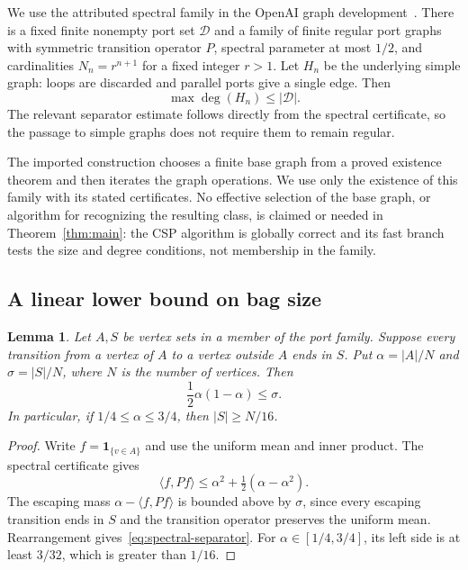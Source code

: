 \documentclass[11pt,reqno]{amsart}
\numberwithin{equation}{section}
\newtheorem{lemma}[theorem]{Lemma}
\theoremstyle{definition}
\theoremstyle{remark}
\newcommand{\ind}[1]{\mathbf 1_{\{#1\}}}
\begin{document}
We use the attributed spectral family in the OpenAI graph development~\cite{OpenAIGraph}. There is a fixed finite nonempty port set $\mathcal D$ and a family of finite regular port graphs with symmetric transition operator $P$, spectral parameter at most $1/2$, and cardinalities $N_n=r^{n+1}$ for a fixed integer $r>1$. Let $H_n$ be the underlying simple graph: loops are discarded and parallel ports give a single edge. Then
\begin{equation}\label{eq:degree-family}
 \max\deg(H_n)\le|\mathcal D|.
\end{equation}
The relevant separator estimate follows directly from the spectral certificate, so the passage to simple graphs does not require them to remain regular.

The imported construction chooses a finite base graph from a proved existence theorem and then iterates the graph operations. We use only the existence of this family with its stated certificates. No effective selection of the base graph, or algorithm for recognizing the resulting class, is claimed or needed in Theorem~\ref{thm:main}: the CSP algorithm is globally correct and its fast branch tests the size and degree conditions, not membership in the family.

\subsection{A linear lower bound on bag size}

\begin{lemma}\label{lem:spectral-separator}
Let $A,S$ be vertex sets in a member of the port family. Suppose every transition from a vertex of $A$ to a vertex outside $A$ ends in $S$. Put $\alpha=|A|/N$ and $\sigma=|S|/N$, where $N$ is the number of vertices. Then
\begin{equation}\label{eq:spectral-separator}
 \frac12\alpha(1-\alpha)\le\sigma.
\end{equation}
In particular, if $1/4\le\alpha\le3/4$, then $|S|\ge N/16$.
\end{lemma}
\begin{proof}
Write $f=\ind{v\in A}$ and use the uniform mean and inner product. The spectral certificate gives
\[
 \langle f,Pf\rangle
 \le\alpha^2+\tfrac12(\alpha-\alpha^2).
\]
The escaping mass $\alpha-\langle f,Pf\rangle$ is bounded above by $\sigma$, since every escaping transition ends in $S$ and the transition operator preserves the uniform mean. Rearrangement gives~\eqref{eq:spectral-separator}. For $\alpha\in[1/4,3/4]$, its left side is at least $3/32$, which is greater than $1/16$.
\end{proof}
\end{document}
